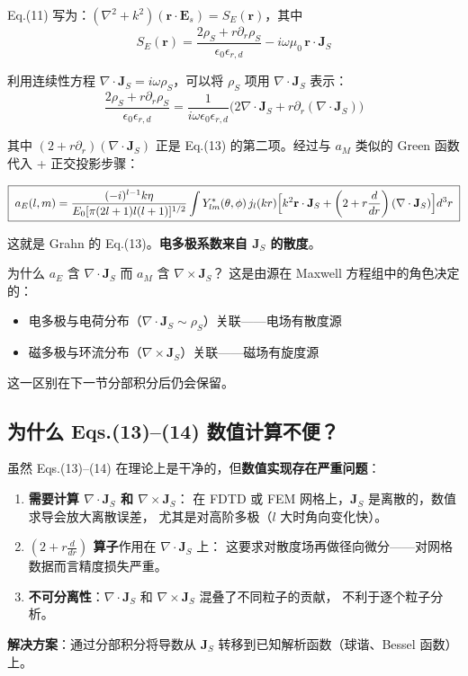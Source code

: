 Eq.(11) 写为：$(\nabla^2+k^2)(\mathbf{r}\cdot\mathbf{E}_s) = S_E(\mathbf{r})$，其中
$$
S_E(\mathbf{r}) = \frac{2\rho_S + r\partial_r\rho_S}{\epsilon_0\epsilon_{r,d}} - i\omega\mu_0\,\mathbf{r}\cdot\mathbf{J}_S
$$

利用连续性方程 $\nabla\cdot\mathbf{J}_S = i\omega\rho_S$，可以将 $\rho_S$ 项用 $\nabla\cdot\mathbf{J}_S$ 表示：
$$
\frac{2\rho_S + r\partial_r\rho_S}{\epsilon_0\epsilon_{r,d}} = \frac{1}{i\omega\epsilon_0\epsilon_{r,d}}\bigl(2\nabla\cdot\mathbf{J}_S + r\partial_r(\nabla\cdot\mathbf{J}_S)\bigr)
$$

其中 $(2+r\partial_r)(\nabla\cdot\mathbf{J}_S)$ 正是 Eq.(13) 的第二项。经过与 $a_M$ 类似的 Green 函数代入 + 正交投影步骤：

\begin{equation}
  \boxed{\;
    a_E(l,m) = \frac{(-i)^{l-1}k\eta}{E_0[\pi(2l+1)l(l+1)]^{1/2}}
    \int Y_{lm}^*(\theta,\phi)\,j_l(kr)\Bigl[
      k^2\mathbf{r}\cdot\mathbf{J}_S + \left(2 + r\frac{d}{dr}\right)(\nabla\cdot\mathbf{J}_S)
    \Bigr] d^3r
    \;}
  \label{eq:aE_J}
\end{equation}

这就是 Grahn 的 Eq.(13)。\textbf{电多极系数来自 $\mathbf{J}_S$ 的散度}。

\begin{stepbox}{为什么 $a_E$ 含 $\nabla\cdot\mathbf{J}_S$ 而 $a_M$ 含 $\nabla\times\mathbf{J}_S$？}
这是由源在 Maxwell 方程组中的角色决定的：
\begin{itemize}
  \item 电多极与电荷分布（$\nabla\cdot\mathbf{J}_S\sim\rho_S$）关联——电场有散度源
  \item 磁多极与环流分布（$\nabla\times\mathbf{J}_S$）关联——磁场有旋度源
\end{itemize}
这一区别在下一节分部积分后仍会保留。
\end{stepbox}

\subsection{为什么 Eqs.(13)--(14) 数值计算不便？}

\begin{noteworthy}
虽然 Eqs.(13)--(14) 在理论上是干净的，但\textbf{数值实现存在严重问题}：
\begin{enumerate}
  \item \textbf{需要计算 $\nabla\cdot\mathbf{J}_S$ 和 $\nabla\times\mathbf{J}_S$}：
    在 FDTD 或 FEM 网格上，$\mathbf{J}_S$ 是离散的，数值求导会放大离散误差，
    尤其是对高阶多极（$l$ 大时角向变化快）。
   \item \textbf{$\left(2+r\frac{d}{dr}\right)$ 算子}作用在 $\nabla\cdot\mathbf{J}_S$ 上：
     这要求对散度场再做径向微分——对网格数据而言精度损失严重。
  \item \textbf{不可分离性}：$\nabla\cdot\mathbf{J}_S$ 和 $\nabla\times\mathbf{J}_S$ 混叠了不同粒子的贡献，
    不利于逐个粒子分析。
\end{enumerate}
\textbf{解决方案}：通过分部积分将导数从 $\mathbf{J}_S$ 转移到已知解析函数（球谐、Bessel 函数）上。
\end{noteworthy}

